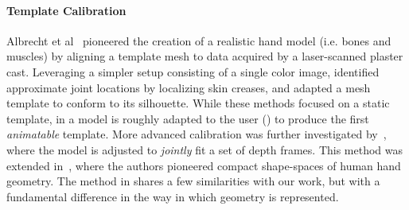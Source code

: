 
\paragraph{Template Calibration}
Albrecht et al~ pioneered the creation of a realistic hand model (i.e. bones and muscles) by aligning a template mesh to data acquired by a laser-scanned plaster cast. Leveraging a simpler setup consisting of a single color image, \cite{rhee2006hand} identified approximate joint locations by localizing skin creases, and adapted a mesh template to conform to its silhouette. While these methods focused on a static template, in \cite{delagorce2011model} a model is roughly adapted to the user () to produce the first \emph{animatable} template. More advanced calibration was further investigated by~\cite{taylor2014user}, where the model is adjusted to \emph{jointly} fit a set of depth frames. This method was extended in~\cite{khamis15learning}, where the authors pioneered compact   shape-spaces of human hand geometry.
% 
The method in \cite{taylor2014user} shares a few similarities with our work, but with a fundamental difference in the way in which geometry is represented. 


